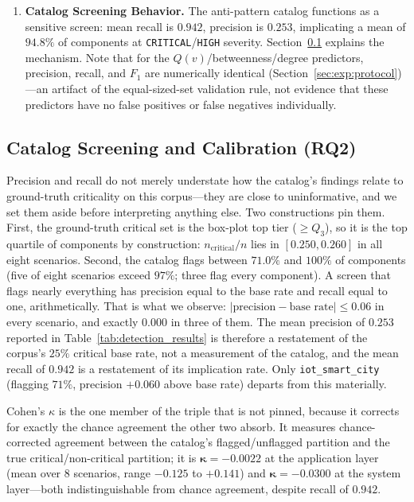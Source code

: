 \begin{enumerate}
    \item \textbf{Catalog Screening Behavior.} The anti-pattern catalog functions as a sensitive screen: mean recall is $0.942$, precision is $0.253$, implicating a mean of $94.8\%$ of components at \texttt{CRITICAL}/\texttt{HIGH} severity. Section~\ref{sec:results:calibration} explains the mechanism. Note that for the $Q(v)$/betweenness/degree predictors, precision, recall, and $F_1$ are numerically identical (Section~\ref{sec:exp:protocol})---an artifact of the equal-sized-set validation rule, not evidence that these predictors have no false positives or false negatives individually.
\end{enumerate}

\subsection{Catalog Screening and Calibration (RQ2)}
\label{sec:results:calibration}

Precision and recall do not merely understate how the catalog's findings relate to ground-truth criticality on this corpus---they are close to uninformative, and we set them aside before interpreting anything else. Two constructions pin them. First, the ground-truth critical set is the box-plot top tier ($\ge Q_3$), so it is the top quartile of components by construction: $n_{\text{critical}}/n$ lies in $[0.250, 0.260]$ in all eight scenarios. Second, the catalog flags between $71.0\%$ and $100\%$ of components (five of eight scenarios exceed $97\%$; three flag every component). A screen that flags nearly everything has precision equal to the base rate and recall equal to one, arithmetically. That is what we observe: $|\text{precision} - \text{base rate}| \le 0.06$ in every scenario, and exactly $0.000$ in three of them. The mean precision of $0.253$ reported in Table~\ref{tab:detection_results} is therefore a restatement of the corpus's $25\%$ critical base rate, not a measurement of the catalog, and the mean recall of $0.942$ is a restatement of its implication rate. Only \texttt{iot\_smart\_city} (flagging $71\%$, precision $+0.060$ above base rate) departs from this materially.

Cohen's $\kappa$ is the one member of the triple that is not pinned, because it corrects for exactly the chance agreement the other two absorb. It measures chance-corrected agreement between the catalog's flagged/unflagged partition and the true critical/non-critical partition; it is $\mathbf{\kappa = -0.0022}$ at the application layer (mean over 8 scenarios, range $-0.125$ to $+0.141$) and $\mathbf{\kappa = -0.0300}$ at the system layer---both indistinguishable from chance agreement, despite recall of $0.942$.

